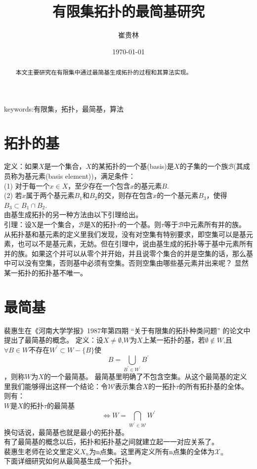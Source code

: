 \documentclass[a4paper,12pt]{article}
\title{有限集拓扑的最简基研究}
\author{崔贵林}
\date{\today}
\begin{document}
\begin{CJK*}{UTF8}{gbsn}
	\maketitle
	\begin{abstract}
		本文主要研究在有限集中通过最简基生成拓扑的过程和其算法实现。
	\end{abstract}
	{keywords}:有限集，拓扑，最简基，算法
	\newpage
	\section{拓扑的基}
	定义：如果$X$是一个集合，$X$的某拓扑的一个基(basis)是$X$的子集的一个族$\mathcal{B}$(其成员称为基元素(basis element))，满足条件：\\
	(1) 对于每一个$x \in X$，至少存在一个包含$x$的基元素$B$.\\
	(2) 若$x$属于两个基元素$B_1$和$B_2$的交，则存在包含$x$的一个基元素$B_3$，使得$B_3 \subset B_1 \cap B_2$.\\
	由基生成拓扑的另一种方法由以下引理给出。\\
	引理：设X是一个集合，$\mathcal{B}$是X的拓扑$\tau$的一个基。则$\tau$等于$\mathcal{B}$中元素所有并的族。
	从拓扑基和基元素的定义里我们发现，没有对空集有特别要求，即空集可以是基元素，也可以不是基元素，无妨。但在引理中，说由基生成的拓扑等于基中元素所有并的族。如果这个并可以从零个并开始，并且说零个集合的并是空集的话，那么基中可以没有空集，否则基中必须有空集。否则空集由哪些基元素并出来呢？
	显然某一拓扑的拓扑基不唯一。
	\section{最简基}
	裴惠生在《河南大学学报》1987年第四期 “关于有限集的拓扑种类问题” 的论文中提出了最简基的概念。
	定义：设$X \ne \emptyset$,$W$为$X$上某一拓扑的基，若$\emptyset \notin W$,且$\forall B \in W$不存在$W^{'} \subset W - \{B\}$使$$B=\bigcup_{B^{'}\in W^{'}}{B^{'}}$$，则称$W$为$X$的一个最简基。
	最简基里明确了不包含空集。从这个最简基的定义里我们能够得出这样一个结论：令$\mathcal{W}$表示集合$X$的一拓扑$\tau$的所有拓扑基的全体。则有：\\$W$是$X$的拓扑$\tau$的最简基$$\Longleftrightarrow W=\bigcap_{W^{'}\in \mathcal{W}}{W^{'}}$$
	换句话说，最简基也就是最小的拓扑基。\\
	有了最简基的概念以后，拓扑和拓扑基之间就建立起一一对应关系了。\\
	裴惠生老师在论文里定义$X_n$为n点集。这里再定义所有n点集的全体为$\mathcal{X}_n$\\
	下面详细研究如何从最简基生成一个拓扑。\\

\end{CJK*}
\end{document}
